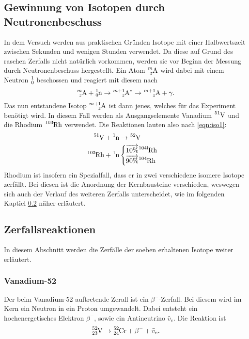 \subsection{Gewinnung von Isotopen durch Neutronenbeschuss}
In dem Versuch werden aus praktischen Gründen Isotope mit einer Halbwertszeit zwischen Sekunden und 
wenigen Stunden verwendet. Da diese auf Grund des raschen Zerfalls nicht natürlich vorkommen, werden 
sie vor Beginn der Messung durch Neutronenbeschuss hergestellt. Ein Atom $\ce{^{m}_{z}A}$ wird dabei 
mit einem Neutron $\ce{^{1}_{0}}$ beschossen und reagiert mit diesem nach
\begin{equation}
    \ce{^{m}_{z}A}+\ce{^{1}_{0}n}\rightarrow
    \ce{^{m + 1}_{z}A^*}
    \rightarrow\ce{^{m + 1}_{z}A}+\gamma. \label{eqn:iso1}
\end{equation}
Das nun entstandene Isotop $\ce{^{m + 1}_{z}A}$ ist dann jenes, welches für das Experiment benötigt
wird. In diesem Fall werden als Ausgangselemente Vanadium $\ce{^{51}V}$ und die Rhodium $\ce{^{103}Rh}$
verwendet. Die Reaktionen lauten also nach \ref{eqn:iso1}:
\begin{align*}
    \ce{^{51}V}+\ce{^{1}n}&\rightarrow\ce{^{52}V}\\
    \ce{^{103}Rh}+\ce{^{1}n}&
    \begin{cases}
        \overrightarrow{\tiny{10\%}} \ce{^{104 i}Rh}\\
        \overrightarrow{\tiny{90\%}} \ce{^{104}Rh}
    \end{cases}
\end{align*}
Rhodium ist insofern ein Spezialfall, dass er in zwei verschiedene isomere Isotope zerfällt. Bei diesen
ist die Anordnung der Kernbausteine verschieden, weswegen sich auch der Verlauf des weiteren Zerfalls
unterscheidet, wie im folgenden Kaptiel \ref{sec:Zerfallsreaktionen} näher erläutert. 
\subsection{Zerfallsreaktionen}
\label{sec:Zerfallsreaktionen}
In diesem Abschnitt werden die Zerfälle der soeben erhaltenen Isotope weiter erläutert.
\subsubsection*{Vanadium-52} 
Der beim Vanadium-52 auftretende Zerall ist ein $\beta^-$-Zerfall. Bei diesem wird im Kern ein Neutron
in ein Proton umgewandelt. Dabei entsteht ein hochenergetisches Elektron $\beta^-$, sowie ein 
Antineutrino $\bar{v}_e$. Die Reaktion ist
\begin{equation}
    \ce{^{52}_{23}V}\rightarrow\ce{^{52}_{24}Cr}+\beta^-+\bar{v}_e. \label{eqn:VZerfall}
\end{equation}
